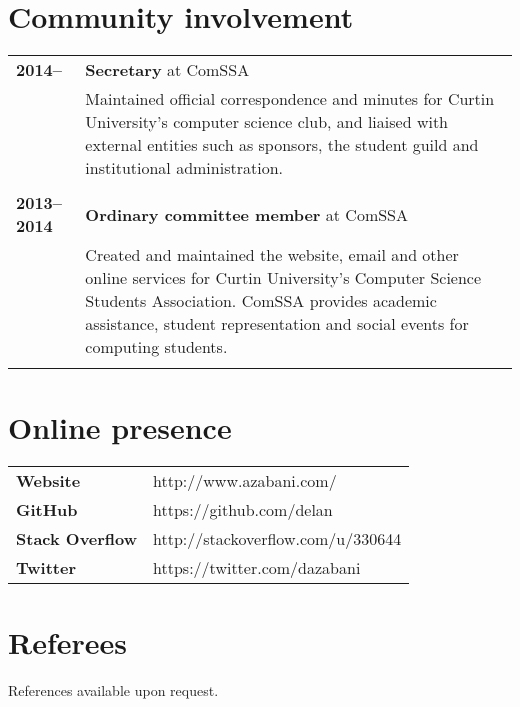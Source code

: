 \documentclass[a4paper,12pt]{article}
\begin{document}
\section*{Community involvement}

\begin{tabular}{p{3.5cm}p{12.5cm}}
	\textbf{2014--} &
		\textbf{Secretary} at ComSSA\\ &
		Maintained official correspondence and minutes for Curtin
		University's computer science club, and liaised with external
		entities such as sponsors, the student guild and institutional
		administration.\\\\
	\textbf{2013--2014} &
		\textbf{Ordinary committee member} at ComSSA\\ &
		Created and maintained the website, email and other online
		services for Curtin University's Computer Science Students
		Association. ComSSA provides academic assistance, student
		representation and social events for computing students.\\\\
\end{tabular}

\section*{Online presence}

\begin{tabular}{p{3.5cm}p{12.5cm}}
	\textbf{Website} &
		http://www.azabani.com/ \\
	\textbf{GitHub} &
		https://github.com/delan \\
	\textbf{Stack Overflow} &
		http://stackoverflow.com/u/330644 \\
	\textbf{Twitter} &
		https://twitter.com/dazabani \\
\end{tabular}

\section*{Referees}

References available upon request.
\end{document}
